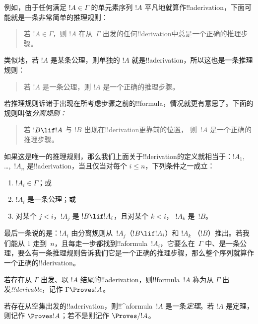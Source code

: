 \documentclass[../../../include/open-logic-section]{subfiles}
\begin{document}
  例如，由于任何满足 $!A \in \Gamma$ 的单元素序列 $!A$ 平凡地就算作!!a{derivation}，下面可能就是一条非常简单的推理规则：
\begin{quote}
  若 $!A \in \Gamma$，则 $!A$ 在从~$\Gamma$ 出发的任何!!{derivation}中总是一个正确的推理步骤。
\end{quote}
  类似地，若 $!A$ 是某条公理，则单独的 $!A$ 就是!!a{derivation}，所以这也是一条推理规则：
\begin{quote}
  若 $!A$ 是一条公理，则 $!A$ 是一个正确的推理步骤。
\end{quote}
  若推理规则诉诸于出现在所考虑步骤之前的!!{formula}，情况就更有意思了。下面的规则叫做\emph{分离规则：}
\begin{quote}
  若 $!B \lif !A$ 与 $!B$ 出现在!!{derivation}更靠前的位置，
  则~$!A$ 是一个正确的推理步骤。
\end{quote}
  如果这是唯一的推理规则，那么我们上面关于!!{derivation}的定义就相当于：$!A_1$, \dots,~$!A_n$ 是!!a{derivation}，当且仅当对每个 $i \le n$，下列条件之一成立：
\begin{enumerate}
\item $!A_i \in \Gamma$；或
\item $!A_i$ 是一条公理；或
\item 对某个 $j < i$，$!A_j$ 是 $!B \lif !A_i$，且对某个 $k < i$，
  $!A_k$ 是~$!B$。
\end{enumerate}
  最后一条说的是：$!A_i$ 由分离规则从~$!A_j$（$!B \lif !A_i$）和 $!A_k$
  （$!B$）推出。若我们能从 $1$ 走到~$n$，且每走一步都找到!!a{formula}~$!A_i$，它要么在~$\Gamma$ 中、是一条公理，要么有一条推理规则告诉我们它是一个正确的推理步骤，那么整个序列就算作一个正确的!!{derivation}。

\begin{defn}[!!^{derivability}]
  若存在从 $\Gamma$ 出发、以 $!A$ 结尾的!!a{derivation}，则!!{formula}~$!A$ 称为从 $\Gamma$ 出发\emph{!!{derivable}}，记作
  $\Gamma \Proves !A$。
\end{defn}

\begin{defn}[定理]
  若存在从空集出发的!!a{derivation}，则!!^a{formula}~$!A$ 是一条\emph{定理}。若 $!A$ 是定理，则记作 $\Proves !A$；若不是则记作 $\Proves/ !A$。
\end{defn}
\end{document}
